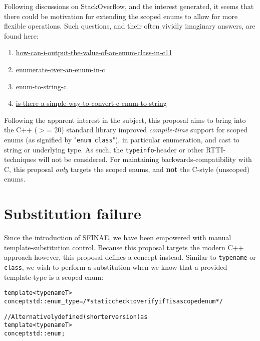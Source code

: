 \documentclass[a4paper, 12pt]{article}
\title{\mytitle}
\author{\small Alexander Christensen}
\date{\vspace{-2mm}\small \today}
\begin{document}
\maketitle
\thispagestyle{firststyle}

Following discussions on StackOverflow, and the interest generated, it seems
that there could be motivation for extending the scoped enums to allow for
more flexible operations. Such questions, and their often vividly imaginary
answers, are found here:

\begin{enumerate}
\item \href{https://stackoverflow.com/questions/11421432/how-can-i-output-the-value-of-an-enum-class-in-c11}{how-can-i-output-the-value-of-an-enum-class-in-c11}
\item \href{https://stackoverflow.com/questions/1390703/enumerate-over-an-enum-in-c}{enumerate-over-an-enum-in-c}
\item \href{https://stackoverflow.com/questions/6281461/enum-to-string-c}{enum-to-string-c}
\item \href{https://stackoverflow.com/questions/201593/is-there-a-simple-way-to-convert-c-enum-to-string}{is-there-a-simple-way-to-convert-c-enum-to-string}
\end{enumerate}

Following the apparent interest in the subject, this proposal aims to bring
into the C++ ($>$= 20) standard library improved \textit{compile-time} support
for scoped enums (as signified by "\texttt{enum class}"), in particular
enumeration, and cast to string or underlying type. As such, the
\texttt{typeinfo}-header or other RTTI-techniques will not be considered.
For maintaining backwards-compatibility with C, this proposal \textit{only}
targets the scoped enums, and \textbf{not} the C-style (unscoped) enums.


\section{Substitution failure}

Since the introduction of SFINAE, we have been empowered with manual
template-substitution control. Because this proposal targets the modern C++
approach however, this proposal defines a concept instead. Similar to
\texttt{typename} or \texttt{class}, we wish to perform a substitution when
we know that a provided template-type is a scoped enum:

\begin{alltt}\footnotesize
template<typename T>
concept std::enum\_type = /* static check to verify if T is a scoped enum */

// Alternatively defined (shorter version) as
template<typename T>
concept std::enum;
\end{alltt}
\end{document}
